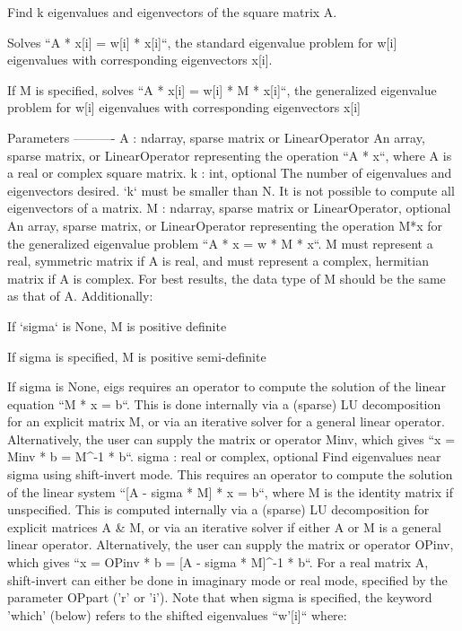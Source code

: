 \begin{DoxyVerb}Find k eigenvalues and eigenvectors of the square matrix A.

Solves ``A * x[i] = w[i] * x[i]``, the standard eigenvalue problem
for w[i] eigenvalues with corresponding eigenvectors x[i].

If M is specified, solves ``A * x[i] = w[i] * M * x[i]``, the
generalized eigenvalue problem for w[i] eigenvalues
with corresponding eigenvectors x[i]

Parameters
----------
A : ndarray, sparse matrix or LinearOperator
    An array, sparse matrix, or LinearOperator representing
    the operation ``A * x``, where A is a real or complex square matrix.
k : int, optional
    The number of eigenvalues and eigenvectors desired.
    `k` must be smaller than N. It is not possible to compute all
    eigenvectors of a matrix.
M : ndarray, sparse matrix or LinearOperator, optional
    An array, sparse matrix, or LinearOperator representing
    the operation M*x for the generalized eigenvalue problem
      ``A * x = w * M * x``.
    M must represent a real, symmetric matrix if A is real, and must
    represent a complex, hermitian matrix if A is complex. For best
    results, the data type of M should be the same as that of A.
    Additionally:

        If `sigma` is None, M is positive definite

        If sigma is specified, M is positive semi-definite

    If sigma is None, eigs requires an operator to compute the solution
    of the linear equation ``M * x = b``.  This is done internally via a
    (sparse) LU decomposition for an explicit matrix M, or via an
    iterative solver for a general linear operator.  Alternatively,
    the user can supply the matrix or operator Minv, which gives
    ``x = Minv * b = M^-1 * b``.
sigma : real or complex, optional
    Find eigenvalues near sigma using shift-invert mode.  This requires
    an operator to compute the solution of the linear system
    ``[A - sigma * M] * x = b``, where M is the identity matrix if
    unspecified. This is computed internally via a (sparse) LU
    decomposition for explicit matrices A & M, or via an iterative
    solver if either A or M is a general linear operator.
    Alternatively, the user can supply the matrix or operator OPinv,
    which gives ``x = OPinv * b = [A - sigma * M]^-1 * b``.
    For a real matrix A, shift-invert can either be done in imaginary
    mode or real mode, specified by the parameter OPpart ('r' or 'i').
    Note that when sigma is specified, the keyword 'which' (below)
    refers to the shifted eigenvalues ``w'[i]`` where:


\end{DoxyVerb}
